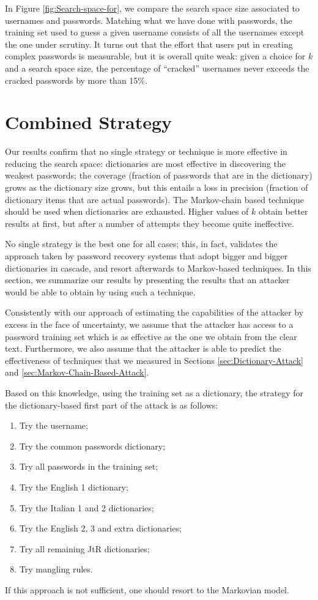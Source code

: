 \documentclass[a4paper,twocolumn]{article}
\begin{document}
In Figure \ref{fig:Search-space-for}, we compare the search space
size associated to usernames and passwords. Matching what we have
done with passwords, the training set used to guess a given username
consists of all the usernames except the one under scrutiny. It turns
out that the effort that users put in creating complex passwords is
measurable, but it is overall quite weak: given a choice for $k$
and a search space size, the percentage of {}``cracked'' usernames
never exceeds the cracked passwords by more than 15\%.


\section{Combined Strategy}

Our results confirm that no single strategy or technique is more effective
in reducing the search space: dictionaries are most effective in discovering
the weakest passwords; the coverage (fraction of passwords that are
in the dictionary) grows as the dictionary size grows, but this entails
a loss in precision (fraction of dictionary items that are actual
passwords). The Markov-chain based technique should be used when dictionaries
are exhausted. Higher values of $k$ obtain better results at first,
but after a number of attempts they become quite ineffective.

No single strategy is the best one for all cases; this, in fact, validates
the approach taken by password recovery systems that adopt bigger
and bigger dictionaries in cascade, and resort afterwards to Markov-based
techniques. In this section, we summarize our results by presenting
the results that an attacker would be able to obtain by using such
a technique.

Consistently with our approach of estimating the capabilities of the
attacker by excess in the face of uncertainty, we assume that the
attacker has access to a password training set which is as effective
as the one we obtain from the clear text. Furthermore, we also assume
that the attacker is able to predict the effectiveness of techniques
that we measured in Sections \ref{sec:Dictionary-Attack} and \ref{sec:Markov-Chain-Based-Attack}.

Based on this knowledge, using the training set as a dictionary, the
strategy for the dictionary-based first part of the attack is as follows:
\begin{enumerate}
\item Try the username;
\item Try the common passwords dictionary;
\item Try all passwords in the training set;
\item Try the English 1 dictionary;
\item Try the Italian 1 and 2 dictionaries;
\item Try the English 2, 3 and extra dictionaries;
\item Try all remaining JtR dictionaries;
\item Try mangling rules.
\end{enumerate}
If this approach is not sufficient, one should resort to the Markovian
model.
\end{document}
